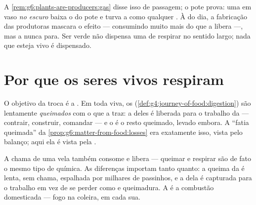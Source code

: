 \begin{remark}\label{rem:g7:what-is-respiration:plants}
A \cref{rem:g6:plants-are-producers:gas} disse isso de passagem; o
pote prova: uma  em vaso \emph{no escuro} baixa o  do
pote e turva a  como qualquer . À  do dia, a
fabricação das produtoras mascara o efeito --- consumindo muito mais
 do que a  libera ---, mas a  nunca
para. Ser verde não dispensa uma  de respirar no sentido largo;
nada que esteja vivo é dispensado.
\end{remark}

\section{Por que os seres vivos respiram}

\begin{proposition}\label{prop:g7:what-is-respiration:power}
O objetivo da troca é a \emph{}. Em toda  viva, os
 (\cref{def:g4:journey-of-food:digestion}) são lentamente
\emph{queimados} com o  que a  traz: a  deles
é liberada para o trabalho da  --- contrair, construir, comandar
--- e o  é o resto queimado, levado embora. A ``fatia
queimada'' da \cref{prop:g6:matter-from-food:losses} era exatamente
isso, vista pelo balanço; aqui ela é vista pela .
\end{proposition}
\admitted

\begin{example}\label{ex:g7:what-is-respiration:fire}
A chama de uma vela também consome  e libera  ---
queimar e respirar são de fato o mesmo tipo de química. As diferenças
importam tanto quanto: a queima da  é lenta, sem chama,
espalhada por milhares de passinhos, e a  dela é capturada para
o trabalho em vez de se perder como  e queimadura. A  é a
combustão domesticada --- fogo na coleira, em cada  sua.
\end{example}

